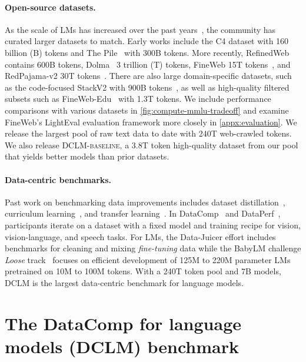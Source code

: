 \paragraph{Open-source datasets.} As the scale of LMs has increased over the past years~\citep{llama,llama2,llama3,Chowdhery2022PaLMSL,chinchilla,gpt4,gopher,gemmateam2024gemma}, the community has curated larger datasets to match. Early works include the C4 dataset with 160 billion (B) tokens and The Pile~\citep{pile} with 300B tokens. More recently, RefinedWeb~\citep{refinedweb} contains 600B tokens, Dolma~\citep{soldaini2024dolma} 3 trillion (T) tokens, FineWeb 15T tokens~\citep{penedo2024fineweb}, and RedPajama-v2 30T tokens~\citep{rpjv2}. There are also large domain-specific datasets, such as the code-focused StackV2 with 900B tokens~\citep{lozhkov2024starcoder}, as well as high-quality filtered subsets such as FineWeb-Edu~\citep{lozhkov2024fineweb-edu} with 1.3T tokens. We include performance comparisons with various datasets in \ref{fig:compute-mmlu-tradeoff} and examine FineWeb's LightEval evaluation framework more closely in \ref{appx:evaluation}.
We release the largest pool of raw text data to date with 240T web-crawled tokens. We also release \textsc{DCLM-baseline}, a 3.8T token high-quality dataset from our pool that yields better models than prior datasets.

\paragraph{Data-centric benchmarks.} Past work on benchmarking data improvements includes dataset distillation~\citep{cui2022dcbench}, curriculum learning~\citep{pmlr-v139-romac21a}, and transfer learning~\citep{albalak-etal-2022-feta,pmlr-v162-bugliarello22a}. In DataComp~\citep{gadre2024datacomp} and DataPerf~\citep{dataperf}, participants iterate on a dataset with a fixed model and training recipe for vision, vision-language, and speech tasks. For LMs, the Data-Juicer \citep{datajuicer2023} effort includes benchmarks for cleaning and mixing \textit{fine-tuning} data while the BabyLM challenge \emph{Loose} track~\citep{warstadt-etal-2023-findings} focuses on efficient development of 125M to 220M parameter LMs pretrained on 10M to 100M tokens. With a 240T token pool and 7B models, \textsc{DCLM} is the largest data-centric benchmark for language models.

\section{The DataComp for language models (\textsc{DCLM}) benchmark}\label{sec:benchmark}

